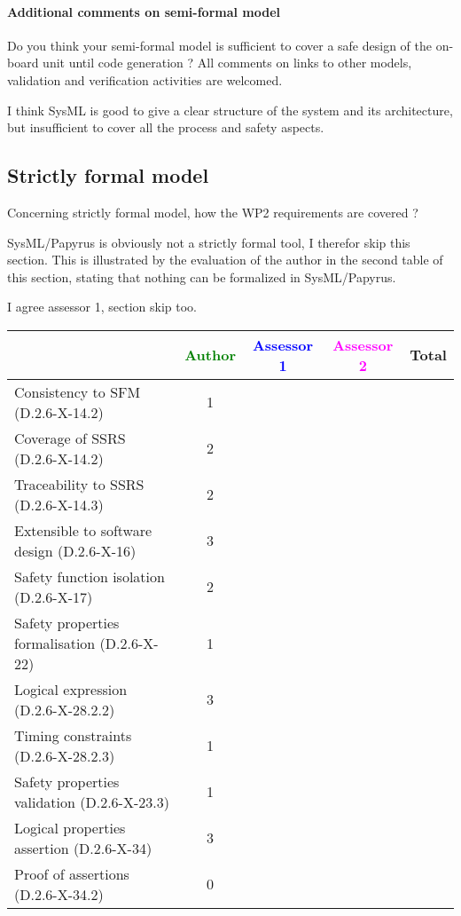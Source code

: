 \paragraph{Additional comments on semi-formal model} Do you think your semi-formal model is sufficient to cover a safe design of the on-board unit until code generation ?
All comments on links to other models, validation and verification activities are welcomed.


\begin{assessor2}
I think SysML is good to give a clear structure of the system and its architecture, but insufficient to cover all the process and safety aspects.
\end{assessor2}

\subsection{Strictly formal model}

Concerning strictly formal model, how the WP2 requirements are covered ?

\begin{assessor1}
SysML/Papyrus is obviously not a strictly formal tool, I therefor skip this section. 
This is illustrated by the evaluation of the author in the second table of this section, stating that nothing can be formalized in SysML/Papyrus. 
\end{assessor1}


\begin{assessor2}
I agree assessor 1, section skip too.
\end{assessor2}

\begin{tabular}{|l | c | c | c | c|}
\hline
& \textcolor{green}{Author} & \textcolor{blue}{Assessor 1} & \textcolor{magenta}{Assessor 2} & Total \\
\hline
Consistency to SFM (D.2.6-X-14.2) & 1 & & & \\
\hline
Coverage of SSRS (D.2.6-X-14.2) & 2 & & & \\
\hline
Traceability to SSRS (D.2.6-X-14.3) & 2 && & \\
\hline
Extensible to software design (D.2.6-X-16) & 3 & & & \\
\hline
Safety function isolation (D.2.6-X-17) & 2 & & & \\
\hline
Safety properties formalisation (D.2.6-X-22) & 1 & & & \\
\hline
Logical expression (D.2.6-X-28.2.2) & 3 & & & \\
\hline
Timing constraints (D.2.6-X-28.2.3) & 1 & & & \\
\hline
Safety properties validation (D.2.6-X-23.3) & 1 & & & \\
\hline
Logical properties assertion (D.2.6-X-34) & 3 & & & \\
\hline
Proof of assertions (D.2.6-X-34.2) & 0 & & & \\
\hline
\end{tabular}

